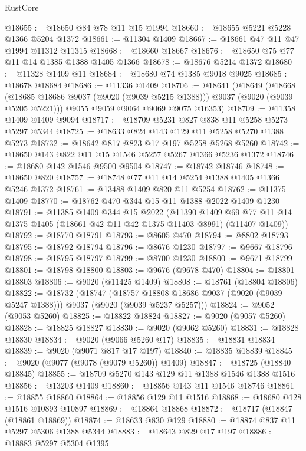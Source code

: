\begin{lexlean}{RustCore}
\begin{coremodule}
@18655 := @18650 @84 @78 @11 @15 @1994
@18660 := @18655 @5221 @5228 @1366 @5204 @1372
@18661 := @11304 @1409
@18667 := @18661 @47 @11 @47 @1994 @11312 @11315
@18668 := @18660 @18667
@18676 := @18650 @75 @77 @11 @14 @1385 @1388 @1405 @1366
@18678 := @18676 @5214 @1372
@18680 := @11328 @1409 @11
@18684 := @18680 @74 @1385 @9018 @9025
@18685 := @18678 @18684
@18686 := @11336 @1409
@18706 := @18641
    (@18649
      (@18668 (@18685 @18686 @9037 (@9020 (@9039 @5215 @1388))) @9037 (@9020 (@9039 @5205 @5221)))
      @9055
      @9059
      @9064
      @9069
      @9075
      @16353)
@18709 := @11358 @1409 @1409 @9094
@18717 := @18709 @5231 @827 @838 @11 @5258 @5273 @5297 @5344
@18725 := @18633 @824 @143 @129 @11 @5258 @5270 @1388 @5273
@18732 := @18642 @817 @823 @17 @197 @5258 @5268 @5260
@18742 := @18650 @143 @822 @11 @15 @1546 @5257 @5267 @1366 @5236 @1372
@18746 := @18680 @142 @1546 @9500 @9504
@18747 := @18742 @18746
@18748 := @18650 @820
@18757 := @18748 @77 @11 @14 @5254 @1388 @1405 @1366 @5246 @1372
@18761 := @13488 @1409 @820 @11 @5254
@18762 := @11375 @1409
@18770 := @18762 @470 @344 @15 @11 @1388 @2022 @1409 @1230
@18791 := @11385
    @1409
    @344
    @15
    @2022
    (@11390
      @1409
      @69
      @77
      @11
      @14
      @1375
      @1405
      (@18661 @42 @11 @42 @1375 @11403 @8991)
      (@11407 @1409))
@18792 := @18770 @18791
@18793 := @8605 @470
@18794 := @8802 @18793
@18795 := @18792 @18794
@18796 := @8676 @1230
@18797 := @9667 @18796
@18798 := @18795 @18797
@18799 := @8700 @1230
@18800 := @9671 @18799
@18801 := @18798 @18800
@18803 := @9676 (@9678 @470)
@18804 := @18801 @18803
@18806 := @9020 (@11425 @1409)
@18808 := @18761 (@18804 @18806)
@18822 := @18732
    (@18747
      (@18757 @18808 @18686 @9037 (@9020 (@9039 @5247 @1388)))
      @9037
      (@9020 (@9039 @5237 @5257)))
@18824 := @9052 (@9053 @5260)
@18825 := @18822 @18824
@18827 := @9020 (@9057 @5260)
@18828 := @18825 @18827
@18830 := @9020 (@9062 @5260)
@18831 := @18828 @18830
@18834 := @9020 (@9066 @5260 @17)
@18835 := @18831 @18834
@18839 := @9020 (@9071 @817 @17 @197)
@18840 := @18835 @18839
@18845 := @9020 (@9077 (@9078 (@9079 @5260)) @1409)
@18847 := @18725 (@18840 @18845)
@18855 := @18709 @5270 @143 @129 @11 @1388 @1546 @1388 @1516
@18856 := @13203 @1409
@18860 := @18856 @143 @11 @1546 @18746
@18861 := @18855 @18860
@18864 := @18856 @129 @11 @1516
@18868 := @18680 @128 @1516 @10893 @10897
@18869 := @18864 @18868
@18872 := @18717 (@18847 (@18861 @18869))
@18874 := @18633 @830 @129
@18880 := @18874 @837 @11 @5297 @5306 @1388 @5344
@18883 := @18643 @829 @17 @197
@18886 := @18883 @5297 @5304 @1395

\end{coremodule}
\end{lexlean}
